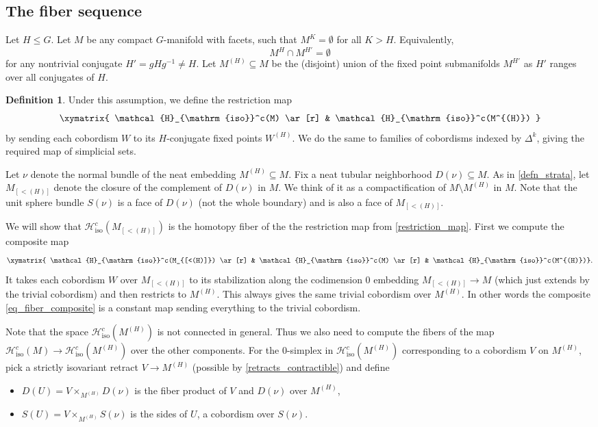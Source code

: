 \documentclass[11pt]{amsart}
\theoremstyle{definition}
\newtheorem{defn}{Definition}[section]
\numberwithin{equation}{section}
\numberwithin{figure}{section}
\newcommand{\Hiso}{\mathcal{H}_{\iso}}
\newcommand{\iso}{\mathrm{iso}}
\begin{document}
\subsection{The fiber sequence}\label{fiberseq}

Let $H \leq G$. Let $M$ be any compact $G$-manifold with facets, such that $M^K = \emptyset$ for all $K > H$. Equivalently,
\[ M^{H} \cap M^{H'} = \emptyset \]
for any nontrivial conjugate $H' = gHg^{-1} \neq H$. Let $M^{(H)} \subseteq M$ be the (disjoint) union of the fixed point submanifolds $M^{H'}$ as $H'$ ranges over all conjugates of $H$.

\begin{defn}\label{restriction_map}
	Under this assumption, we define the restriction map
	\[ \xymatrix{ \Hiso^c(M) \ar[r] & \Hiso^c(M^{(H)}) } \]
	by sending each cobordism $W$ to its $H$-conjugate fixed points $W^{(H)}$. We do the same to families of cobordisms indexed by $\Delta^k$, giving the required map of simplicial sets.
\end{defn}

Let $\nu$ denote the normal bundle of the neat embedding $M^{(H)} \subseteq M$. Fix a neat tubular neighborhood $D(\nu) \subseteq M$. As in \autoref{defn_strata}, let $M_{[<(H)]}$ denote the closure of the complement of $D(\nu)$ in $M$. We think of it as a compactification of $M \setminus M^{(H)}$ in $M$. Note that the unit sphere bundle $S(\nu)$ is a face of $D(\nu)$ (not the whole boundary) and is also a face of $M_{[<(H)]}$.

We will show that $\Hiso^c(M_{[<(H)]})$ is the homotopy fiber of the  the restriction map from \autoref{restriction_map}. First we compute the composite map
\begin{equation}\label{eq_fiber_composite}
	\xymatrix{ \Hiso^c(M_{[<(H)]}) \ar[r] & \Hiso^c(M) \ar[r] & \Hiso^c(M^{(H)})}.
\end{equation}
It takes each cobordism $W$ over $M_{[<(H)]}$ to its stabilization along the codimension 0 embedding $M_{[<(H)]} \to M$ (which just extends by the trivial cobordism) and then restricts to $M^{(H)}$. This always gives the same trivial cobordism over $M^{(H)}$. In other words the composite \eqref{eq_fiber_composite} is a constant map sending everything to the trivial cobordism. %

Note that the space $\Hiso^c(M^{(H)})$ is not connected in general. Thus we also need to compute the fibers of the map $\Hiso^c(M) \to \Hiso^c(M^{(H)})$ over the other components. For the 0-simplex in $\Hiso^c(M^{(H)})$ corresponding to a cobordism $V$ on $M^{(H)}$, pick a strictly isovariant retract $V \to M^{(H)}$ (possible by \autoref{retracts_contractible}) and define
\begin{itemize}
	\item $D(U) = V \times_{M^{(H)}} D(\nu)$ is the fiber product of $V$ and $D(\nu)$ over $M^{(H)}$,
	\item $S(U) = V \times_{M^{(H)}} S(\nu)$ is the sides of $U$, a cobordism over $S(\nu)$.
\end{itemize}
\end{document}
